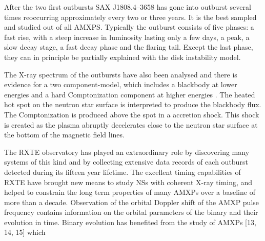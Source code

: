 \documentclass{wihuri}
\begin{document}

After the two first outbursts SAX J1808.4–3658 has gone into outburst several times reoccurring approximately every two or three years. It is the best sampled and studied out of all AMXPS. Typically the outburst consists of five phases: a fast rise, with a steep increase in luminosity lasting only a few days, a peak, a slow decay stage, a fast decay phase and the flaring tail. Except the last phase, they can in principle be partially explained with the disk instability model.




The X-ray spectrum of the outbursts have also been analysed and there is evidence for a two component-model, which includes a blackbody at lower energies and a hard Comptonization component at higher energies \cite{twocompmod} %
. The heated hot spot on the neutron star surface is interpreted to produce the blackbody flux. The Comptonization is produced above the spot in a accretion shock. This shock is created as the plasma abruptly decelerates close to the neutron star surface at the bottom of the magnetic field lines.



\iffalse

The RXTE observatory has played an extraordinary role by discovering many
systems of this kind and by collecting extensive data records of each outburst detected
during its fifteen year lifetime. The excellent timing capabilities of RXTE
have brought new means to study NSs with coherent X-ray timing, and helped to
constrain the long term properties of many AMXPs over a baseline of more than
a decade. Observation of the orbital Doppler shift of the AMXP pulse frequency
contains information on the orbital parameters of the binary and their evolution in
time. Binary evolution has benefited from the study of AMXPs [13, 14, 15] which
\end{document}
